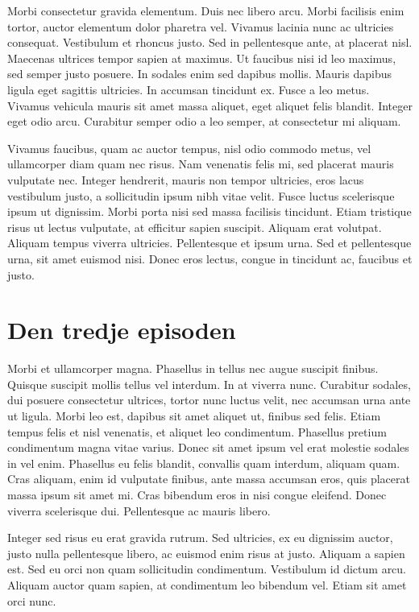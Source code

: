 \documentclass[a4paper,10pt]{article}
\begin{document}
Morbi consectetur gravida elementum. Duis nec libero arcu. Morbi facilisis enim tortor, auctor elementum dolor pharetra vel. Vivamus lacinia nunc ac ultricies consequat. Vestibulum et rhoncus justo. Sed in pellentesque ante, at placerat nisl. Maecenas ultrices tempor sapien at maximus. Ut faucibus nisi id leo maximus, sed semper justo posuere. In sodales enim sed dapibus mollis. Mauris dapibus ligula eget sagittis ultricies. In accumsan tincidunt ex. Fusce a leo metus. Vivamus vehicula mauris sit amet massa aliquet, eget aliquet felis blandit. Integer eget odio arcu. Curabitur semper odio a leo semper, at consectetur mi aliquam.

Vivamus faucibus, quam ac auctor tempus, nisl odio commodo metus, vel ullamcorper diam quam nec risus. Nam venenatis felis mi, sed placerat mauris vulputate nec. Integer hendrerit, mauris non tempor ultricies, eros lacus vestibulum justo, a sollicitudin ipsum nibh vitae velit. Fusce luctus scelerisque ipsum ut dignissim. Morbi porta nisi sed massa facilisis tincidunt. Etiam tristique risus ut lectus vulputate, at efficitur sapien suscipit. Aliquam erat volutpat. Aliquam tempus viverra ultricies. Pellentesque et ipsum urna. Sed et pellentesque urna, sit amet euismod nisi. Donec eros lectus, congue in tincidunt ac, faucibus et justo.
\section{Den tredje episoden}
Morbi et ullamcorper magna. Phasellus in tellus nec augue suscipit finibus. Quisque suscipit mollis tellus vel interdum. In at viverra nunc. Curabitur sodales, dui posuere consectetur ultrices, tortor nunc luctus velit, nec accumsan urna ante ut ligula. Morbi leo est, dapibus sit amet aliquet ut, finibus sed felis. Etiam tempus felis et nisl venenatis, et aliquet leo condimentum. Phasellus pretium condimentum magna vitae varius. Donec sit amet ipsum vel erat molestie sodales in vel enim. Phasellus eu felis blandit, convallis quam interdum, aliquam quam. Cras aliquam, enim id vulputate finibus, ante massa accumsan eros, quis placerat massa ipsum sit amet mi. Cras bibendum eros in nisi congue eleifend. Donec viverra scelerisque dui. Pellentesque ac mauris libero.

Integer sed risus eu erat gravida rutrum. Sed ultricies, ex eu dignissim auctor, justo nulla pellentesque libero, ac euismod enim risus at justo. Aliquam a sapien est. Sed eu orci non quam sollicitudin condimentum. Vestibulum id dictum arcu. Aliquam auctor quam sapien, at condimentum leo bibendum vel. Etiam sit amet orci nunc.
\end{document}
